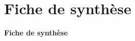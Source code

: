 \section*{Fiche de synthèse}

%
\begingroup

\setlength{\tabcolsep}{10pt}           
\renewcommand{\arraystretch}{1.15}      
\setlength{\arrayrulewidth}{1.1pt}      


\setlength{\emergencystretch}{2em}
\raggedbottom

\newcommand{\cellpadA}[1]{\vspace{0.45em}\noindent #1 \vspace{0.45em}}
\newcommand{\cellpadB}[1]{\vspace{0.30em}\noindent #1 \vspace{0.30em}}


\newenvironment{dashlist}{%
  \begin{list}{--}{%
    \setlength{\leftmargin}{2.2em}%
    \setlength{\labelsep}{0.6em}%
    \setlength{\itemsep}{0.35em}%
    \setlength{\topsep}{0.25em}%
    \setlength{\parsep}{0pt}%
    \setlength{\partopsep}{0pt}%
  }%
}{\end{list}}

\begin{center}
    {\fontsize{36}{40}\selectfont \textbf{Fiche de synthèse}}
\end{center}

\vspace{0.9em}

